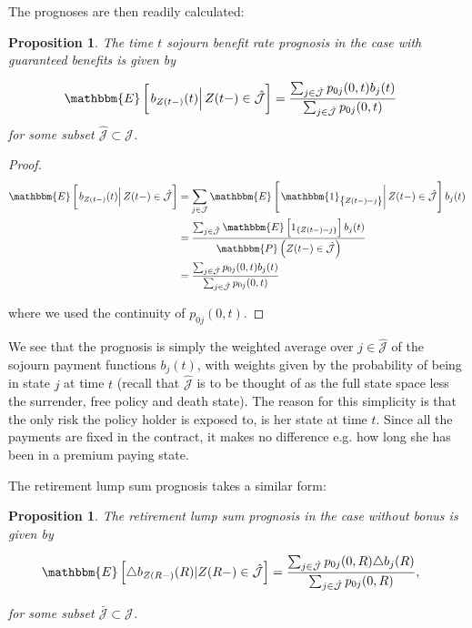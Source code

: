 \documentclass{book}
\newcommand{\1}[1]{\mathbbm{1}_{\left\lbrace #1 \right\rbrace}}
\newcommand{\expec}[1][def]{\mathbbm{E} \left[ #1 \right]}
\newcommand{\econd}[2][def]{\mathbbm{E} \left[ \left. #1 \right| #2 \right]}
\newcommand{\probability}[1][def]{\mathbbm{P} \left( #1 \right)}
\theoremstyle{break}
\newtheorem{proposition}[definition]{Proposition}%
\theoremstyle{remark}
\numberwithin{equation}{section}
\begin{document}
The prognoses are then readily calculated:

\begin{proposition} \label{SojournWithoutBonus}
The time $t$ sojourn benefit rate prognosis in the case with guaranteed benefits is given by

\begin{align*}
    \econd[b_{Z(t-)}(t)]{Z(t-) \in \hat{\mathcal{J}}}
    &= \frac{\sum_{j \in \hat{\mathcal{J}}} p_{0j}(0,t) b_j(t)}{\sum_{j \in \hat{\mathcal{J}}} p_{0j}(0,t)}
\end{align*}
for some subset $\hat{\mathcal{J}} \subset \mathcal{J}$.
\end{proposition}

\begin{proof}
\begin{align*}
   	\econd[b_{Z(t-)}(t)]{Z(t-) \in \hat{\mathcal{J}}} &= \sum_{j \in \mathcal{J}} \econd[\1{Z(t-)=j}]{Z(t-) \in \hat{\mathcal{J}}} b_j(t) \\
    &= \frac{\sum_{j \in \hat{\mathcal{J}}} \expec[ 1_{\{Z(t-)=j\}} ] b_j(t)}{\probability[Z(t-) \in \hat{\mathcal{J}}]} \\
    &= \frac{\sum_{j \in \hat{\mathcal{J}}} p_{0j}(0,t) b_j(t)}{\sum_{j \in \hat{\mathcal{J}}} p_{0j}(0,t)}
\end{align*}

where we used the continuity of $p_{0j}(0,t)$.
\end{proof}

We see that the prognosis is simply the weighted average over $j \in \hat{\mathcal{J}}$ of the sojourn payment functions $b_j(t)$, with weights given by the probability of being in state $j$ at time $t$ (recall that $\hat{\mathcal{J}}$ is to be thought of as the full state space less the surrender, free policy and death state). The reason for this simplicity is that the only risk the policy holder is exposed to, is her state at time $t$. Since all the payments are fixed in the contract, it makes no difference e.g. how long she has been in a premium paying state.

The retirement lump sum prognosis takes a similar form:

\begin{proposition} \label{RetireWithoutBonus}
The retirement lump sum prognosis in the case without bonus is given by

\begin{align*}
    \expec[ \triangle b_{Z(R-)}(R) | Z(R-) \in \hat{\mathcal{J}}]
    &= \frac{\sum_{j \in \hat{\mathcal{J}}} p_{0j}(0,R) \triangle b_j(R)}{\sum_{j \in \hat{\mathcal{J}}} p_{0j}(0,R)},
\end{align*}

for some subset $\bar{\mathcal{J}} \subset \mathcal{J}$.
\end{proposition}
\end{document}
